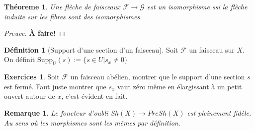 \documentclass[a4paper,12pt]{book}
\newcommand{\F}{\mathscr F}
\newcommand{\Supp}{\textrm{Supp}}
\newcommand{\G}{\mathscr{G}}
\theoremstyle{plain}
\newtheorem{thm}[subsection]{Théoreme}
\newtheorem{rem}{Remarque}
\theoremstyle{definition}
\newtheorem{defn}[subsection]{Définition}
\newtheorem{exo}[subsection]{Exercices}
\theoremstyle{remark}
\begin{document}
\begin{thm}
    Une flèche de faisceaux $\F\to\G$ est un isomorphisme ssi
    la flèche induite sur les fibres sont des isomorphismes.
\end{thm}
\begin{proof}[Preuve]
    \textbf{À faire!}
\end{proof}
\begin{defn}[Support d'une section d'un faisceau]
    Soit $\F$ un faisceau sur $X$. On définit $\Supp_U(s):=\{s\in U| s_x\ne 0\}$
\end{defn}
\begin{exo}
    Soit $\F$ un faisceau abélien, montrer que le support d'une section
    $s$ est fermé. Faut juste montrer que $s_x$ vaut zéro même en 
    élargissant à un petit ouvert autour de $x$, c'est évident en fait.
\end{exo}
\begin{rem}
    Le foncteur d'oubli $Sh(X)\to PreSh(X)$ est pleinement fidèle. 
    Au sens où les morphismes sont les mêmes par définition.
\end{rem}
\end{document}
